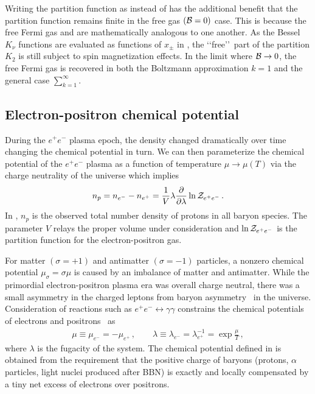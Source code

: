Writing the partition function as  instead of  has the additional benefit that the partition function remains finite in the free gas $({\cal B}=0)$ case. This is because the free Fermi gas and  are mathematically analogous to one another. As the Bessel $K_{\nu}$ functions are evaluated as functions of $x_{\pm}$ in , the \lq\lq free\rq\rq\ part of the partition $K_{2}$ is still subject to spin magnetization effects. In the limit where ${\cal B}\rightarrow0$, the free Fermi gas is recovered in both the Boltzmann approximation $k=1$ and the general case $\sum_{k=1}^{\infty}$.


\subsection{Electron-positron chemical potential}
\label{sec:potentials}
During the $e^{+}e^{-}$ plasma epoch, the density changed dramatically over time changing the chemical potential in turn. We can then parameterize the chemical potential of the $e^{+}e^{-}$ plasma as a function of temperature $\mu\rightarrow\mu(T)$ via the charge neutrality of the universe which implies
\begin{gather}
 \label{chargeneutrality}
 n_{p}=n_{e^{-}}-n_{e^{+}}=\frac{1}{V}\lambda\frac{\partial}{\partial\lambda}\ln{\cal Z}_{e^{+}e^{-}}\,.
\end{gather}
In , $n_{p}$ is the observed total number density of protons in all baryon species. The parameter $V$ relays the proper volume under consideration and $\ln{\cal Z}_{e^{+}e^{-}}$ is the partition function for the electron-positron gas.

For matter $(\sigma=+1)$ and antimatter $(\sigma=-1)$ particles, a nonzero chemical potential $\mu_{\sigma}=\sigma\mu$ is caused by an imbalance of matter and antimatter. While the primordial electron-positron plasma era was overall charge neutral, there was a small asymmetry in the charged leptons from baryon asymmetry~\citep{Fromerth:2012fe,Canetti:2012zc} in the universe. Consideration of reactions such as $e^+e^-\leftrightarrow\gamma\gamma$ constrains the chemical potentials of electrons and positrons~\citep{Elze:1980er} as 
\begin{gather}
 \label{cpotential}
 \mu\equiv\mu_{e^{-}}=-\mu_{e^{+}}\,,\qquad
 \lambda\equiv\lambda_{e^{-}}=\lambda_{e^{+}}^{-1}=\exp\frac{\mu}{T}\,,
\end{gather}
where $\lambda$ is the fugacity of the system. The chemical potential defined in  is obtained from the requirement that the positive charge of baryons (protons, $\alpha$ particles, light nuclei produced after BBN) is exactly and locally compensated by a tiny net excess of electrons over positrons.

